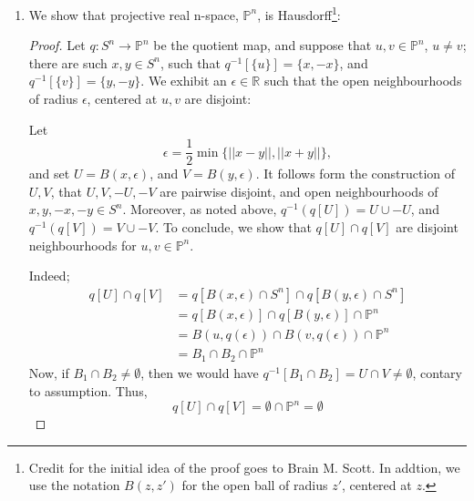 \documentclass{book}
\begin{document}
\begin{enumerate}[(1)]
    \item We show that projective real n-space, $\mathbb{P}^n$, is Hausdorff\footnote{Credit for the initial idea of the proof goes to Brain M. Scott. In addtion, we use the notation $B(z,z')$ for the open ball of radius $z'$, centered at $z$.}: 
        \begin{proof} Let $q:S^n \rightarrow \mathbb{P}^n$ be the quotient map, and suppose that $u,v \in \mathbb{P}^n$, $u \neq v$; there are such $x,y \in S^n$, such that $q^{-1}[\{u\}] = \{x, -x\}$, and $q^{-1}[\{v\}] = \{y, -y\}$. We exhibit an $\epsilon \in \mathbb{R}$ such that the open neighbourhoods of radius $\epsilon$, centered at $u,v$ are disjoint: 
            \par Let $$\epsilon = \frac{1}{2} \min\{ ||x - y ||, ||x +y||\},$$ and set $U = B(x,\epsilon)$, and $V = B(y, \epsilon)$. It follows form the construction of $U,V$, that $U,V,-U,-V$ are pairwise disjoint, and open neighbourhoods of $x,y,-x,-y \in S^n$. Moreover, as noted above, $q^{-1}(q[U]) = U \cup -U$, and $q^{-1}(q[V]) = V \cup -V$. To conclude, we show that $q[U] \cap q[V]$ are disjoint neighbourhoods for $u,v \in \mathbb{P}^n$. 
            \par Indeed; 
            \begin{align*}
                q[U] \cap q[V] & = q[B(x, \epsilon) \cap S^n] \cap q[B(y, \epsilon) \cap S^n] \\
                & = q[B(x, \epsilon)] \cap q[B(y, \epsilon)] \cap \mathbb{P}^n \\
                & = B(u, q(\epsilon)) \cap B(v, q(\epsilon)) \cap \mathbb{P}^n \\
                & = B_1 \cap B_2 \cap \mathbb{P}^n 
            \end{align*}
            Now, if $B_1 \cap B_2 \neq \emptyset$, then we would have $q^{-1}[B_1 \cap B_2] = U \cap V \neq \emptyset$, contary to assumption. Thus, 
            $$q[U] \cap q[V] = \emptyset \cap \mathbb{P}^n = \emptyset$$
        \end{proof}

\end{enumerate}
\end{document}

